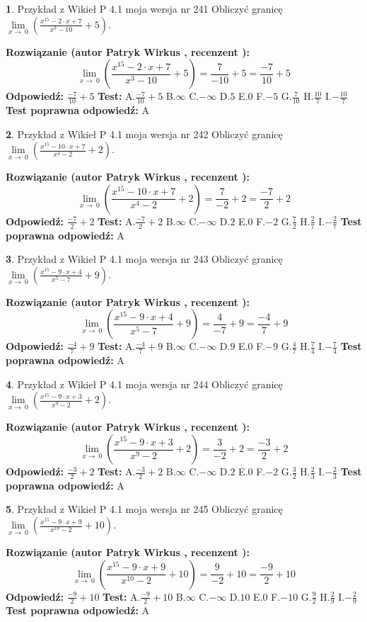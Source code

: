 \documentclass[12pt, a4paper]{article}
\theoremstyle{definition} %
\newtheorem{zad}{}
\newcommand{\zadStart}[1]{\begin{zad}#1\newline}
\newcommand{\zadStop}{\end{zad}}
\newcommand{\rozwStart}[2]{\noindent \textbf{Rozwiązanie (autor #1 , recenzent #2): }\newline}
\newcommand{\rozwStop}{\newline}
\newcommand{\odpStart}{\noindent \textbf{Odpowiedź:}\newline}
\newcommand{\odpStop}{\newline}
\newcommand{\testStart}{\noindent \textbf{Test:}\newline}
\newcommand{\testStop}{\newline}
\newcommand{\kluczStart}{\noindent \textbf{Test poprawna odpowiedź:}\newline}
\newcommand{\kluczStop}{\newline}
\begin{document}
\zadStart{Przykład z Wikieł P 4.1 moja wersja nr 241}
Obliczyć granicę $\lim\limits_{x\to\ 0}(\frac{x^{15}-2 \cdot x +7}{x^{3}-10}+5)$.
\zadStop
\rozwStart{Patryk Wirkus}{}
$$\lim\limits_{x\to\ 0}(\frac{x^{15}-2 \cdot x +7}{x^{3}-10}+5)=\frac{7}{-10}+5=\frac{-7}{10}+5$$
\rozwStop
\odpStart
$\frac{-7}{10}+5$
\odpStop
\testStart
A.$\frac{-7}{10}+5$
B.$\infty$
C.$-\infty$
D.$5$
E.$0$
F.$-5$
G.$\frac{7}{10}$
H.$\frac{10}{7}$
I.$-\frac{10}{7}$
\testStop
\kluczStart
A
\kluczStop



\zadStart{Przykład z Wikieł P 4.1 moja wersja nr 242}
Obliczyć granicę $\lim\limits_{x\to\ 0}(\frac{x^{15}-10 \cdot x +7}{x^{4}-2}+2)$.
\zadStop
\rozwStart{Patryk Wirkus}{}
$$\lim\limits_{x\to\ 0}(\frac{x^{15}-10 \cdot x +7}{x^{4}-2}+2)=\frac{7}{-2}+2=\frac{-7}{2}+2$$
\rozwStop
\odpStart
$\frac{-7}{2}+2$
\odpStop
\testStart
A.$\frac{-7}{2}+2$
B.$\infty$
C.$-\infty$
D.$2$
E.$0$
F.$-2$
G.$\frac{7}{2}$
H.$\frac{2}{7}$
I.$-\frac{2}{7}$
\testStop
\kluczStart
A
\kluczStop



\zadStart{Przykład z Wikieł P 4.1 moja wersja nr 243}
Obliczyć granicę $\lim\limits_{x\to\ 0}(\frac{x^{15}-9 \cdot x +4}{x^{5}-7}+9)$.
\zadStop
\rozwStart{Patryk Wirkus}{}
$$\lim\limits_{x\to\ 0}(\frac{x^{15}-9 \cdot x +4}{x^{5}-7}+9)=\frac{4}{-7}+9=\frac{-4}{7}+9$$
\rozwStop
\odpStart
$\frac{-4}{7}+9$
\odpStop
\testStart
A.$\frac{-4}{7}+9$
B.$\infty$
C.$-\infty$
D.$9$
E.$0$
F.$-9$
G.$\frac{4}{7}$
H.$\frac{7}{4}$
I.$-\frac{7}{4}$
\testStop
\kluczStart
A
\kluczStop



\zadStart{Przykład z Wikieł P 4.1 moja wersja nr 244}
Obliczyć granicę $\lim\limits_{x\to\ 0}(\frac{x^{15}-9 \cdot x +3}{x^{9}-2}+2)$.
\zadStop
\rozwStart{Patryk Wirkus}{}
$$\lim\limits_{x\to\ 0}(\frac{x^{15}-9 \cdot x +3}{x^{9}-2}+2)=\frac{3}{-2}+2=\frac{-3}{2}+2$$
\rozwStop
\odpStart
$\frac{-3}{2}+2$
\odpStop
\testStart
A.$\frac{-3}{2}+2$
B.$\infty$
C.$-\infty$
D.$2$
E.$0$
F.$-2$
G.$\frac{3}{2}$
H.$\frac{2}{3}$
I.$-\frac{2}{3}$
\testStop
\kluczStart
A
\kluczStop



\zadStart{Przykład z Wikieł P 4.1 moja wersja nr 245}
Obliczyć granicę $\lim\limits_{x\to\ 0}(\frac{x^{15}-9 \cdot x +9}{x^{10}-2}+10)$.
\zadStop
\rozwStart{Patryk Wirkus}{}
$$\lim\limits_{x\to\ 0}(\frac{x^{15}-9 \cdot x +9}{x^{10}-2}+10)=\frac{9}{-2}+10=\frac{-9}{2}+10$$
\rozwStop
\odpStart
$\frac{-9}{2}+10$
\odpStop
\testStart
A.$\frac{-9}{2}+10$
B.$\infty$
C.$-\infty$
D.$10$
E.$0$
F.$-10$
G.$\frac{9}{2}$
H.$\frac{2}{9}$
I.$-\frac{2}{9}$
\testStop
\kluczStart
A
\kluczStop
\end{document}
